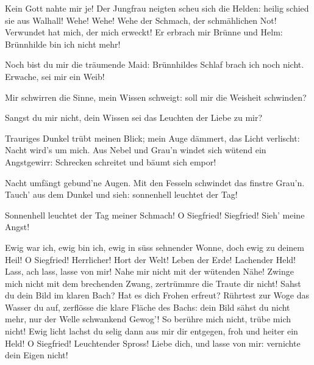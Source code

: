 \begin{drama}

\Brunnhildespeaks

Kein Gott nahte mir je!
Der Jungfrau neigten
scheu sich die Helden:
heilig schied sie aus Walhall!
Wehe! Wehe!
Wehe der Schmach,
der schmählichen Not!
Verwundet hat mich,
der mich erweckt!
Er erbrach mir Brünne und Helm:
Brünnhilde bin ich nicht mehr!

\Siegfriedspeaks

Noch bist du mir
die träumende Maid:
Brünnhildes Schlaf
brach ich noch nicht.
Erwache, sei mir ein Weib!

\Brunnhildespeaks


Mir schwirren die Sinne,
mein Wissen schweigt:
soll mir die Weisheit schwinden?

\Siegfriedspeaks

Sangst du mir nicht,
dein Wissen sei
das Leuchten der Liebe zu mir?

\Brunnhildespeaks


Trauriges Dunkel
trübt meinen Blick;
mein Auge dämmert,
das Licht verlischt:
Nacht wird's um mich.
Aus Nebel und Grau'n
windet sich wütend
ein Angstgewirr:
Schrecken schreitet
und bäumt sich empor!


\Siegfriedspeaks


Nacht umfängt
gebund'ne Augen.
Mit den Fesseln schwindet
das finstre Grau'n.
Tauch' aus dem Dunkel und sieh:
sonnenhell leuchtet der Tag!

\Brunnhildespeaks


Sonnenhell
leuchtet der Tag meiner Schmach!
O Siegfried! Siegfried!
Sieh' meine Angst!


Ewig war ich,
ewig bin ich,
ewig in süss
sehnender Wonne,
doch ewig zu deinem Heil!
O Siegfried! Herrlicher!
Hort der Welt!
Leben der Erde!
Lachender Held!
Lass, ach lass,
lasse von mir!
Nahe mir nicht
mit der wütenden Nähe!
Zwinge mich nicht
mit dem brechenden Zwang,
zertrümmre die Traute dir nicht!
Sahst du dein Bild
im klaren Bach?
Hat es dich Frohen erfreut?
Rührtest zur Woge
das Wasser du auf,
zerflösse die klare
Fläche des Bachs:
dein Bild sähst du nicht mehr,
nur der Welle schwankend Gewog'!
So berühre mich nicht,
trübe mich nicht!
Ewig licht
lachst du selig dann
aus mir dir entgegen,
froh und heiter ein Held!
O Siegfried!
Leuchtender Spross!
Liebe dich,
und lasse von mir:
vernichte dein Eigen nicht!


\end{drama}
